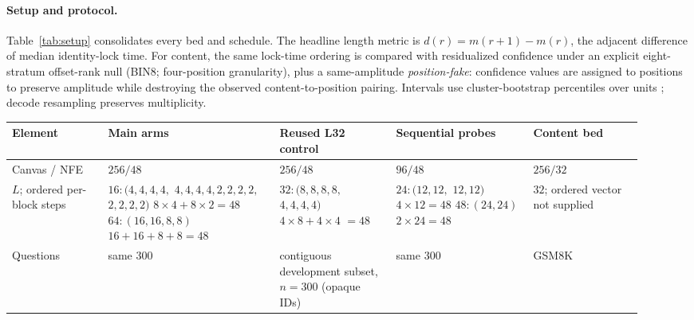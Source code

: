 \documentclass{article}
\begin{document}
\paragraph{Setup and protocol.}
Table~\ref{tab:setup} consolidates every bed and schedule. The headline length
metric is $d(r)=m(r{+}1)-m(r)$, the adjacent difference of median identity-lock
time. For content, the same lock-time ordering is compared with residualized
confidence under an explicit eight-stratum offset-rank null (BIN8; four-position
granularity), plus a same-amplitude \emph{position-fake}: confidence values are
assigned to positions to preserve amplitude while destroying the observed
content-to-position pairing. Intervals use cluster-bootstrap percentiles over
units \citep{davison1997bootstrap}; decode resampling preserves multiplicity.

\begin{table}[t]
\centering
\scriptsize
\setlength{\tabcolsep}{1.5pt}
\begin{tabular}{@{}>{\raggedright\arraybackslash}p{0.14\linewidth}
                  >{\raggedright\arraybackslash}p{0.25\linewidth}
                  >{\raggedright\arraybackslash}p{0.17\linewidth}
                  >{\raggedright\arraybackslash}p{0.20\linewidth}
                  >{\raggedright\arraybackslash}p{0.16\linewidth}@{}}
\toprule
Element & Main arms & Reused L32 control & Sequential probes & Content bed \\
\midrule
Canvas / NFE & $256/48$ & $256/48$ & $96/48$ & $256/32$ \\
$L$; ordered per-block steps & \shortstack[l]{$16:(4,4,4,4,$\\$4,4,4,4,2,2,2,2,$\\$2,2,2,2)$\\$8\!\times\!4+8\!\times\!2=48$\\$64:(16,16,8,8)$\\$16+16+8+8=48$} & \shortstack[l]{$32:(8,8,8,8,$\\$4,4,4,4)$\\$4\!\times\!8+4\!\times\!4$\\$=48$} & \shortstack[l]{$24:(12,12,$\\$12,12)$\\$4\!\times\!12=48$\\$48:(24,24)$\\$2\!\times\!24=48$} & \shortstack[l]{$32$; ordered\\vector not supplied} \\
Questions & same $300$ & contiguous development subset, $n{=}300$ (opaque IDs) & same $300$ & GSM8K \\

\end{tabular}
\end{table}
\end{document}
